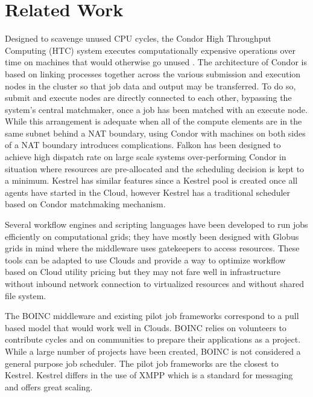 \chapter{Related Work}
\label{chap:Related-Work}
Designed to scavenge unused CPU cycles, the Condor High Throughput
Computing (HTC) system executes computationally expensive operations
over time on machines that would otherwise go unused \cite{Tannenbaum2001,DouglasThain2006}.
The architecture of Condor is based on linking processes together
across the various submission and execution nodes in the cluster so
that job data and output may be transferred. To do so, submit and
execute nodes are directly connected to each other, bypassing the
system's central matchmaker, once a job has been matched with an execute
node. While this arrangement is adequate when all of the compute elements
are in the same subnet behind a NAT boundary, using Condor with machines
on both sides of a NAT boundary introduces complications. Falkon \cite{Raicu2007}has
been designed to achieve high dispatch rate on large scale systems
over-performing Condor in situation where resources are pre-allocated
and the scheduling decision is kept to a minimum. Kestrel has similar
features since a Kestrel pool is created once all agents have started
in the Cloud, however Kestrel has a traditional scheduler based on
Condor matchmaking mechanism.

Several workflow engines \cite{Deelman2004,Oinn2004} and scripting
languages \cite{Wilde2009} have been developed to run jobs efficiently
on computational grids; they have mostly been designed with Globus
\cite{Foster1997} grids in mind where the middleware uses gatekeepers
to access resources. These tools can be adapted to use Clouds and
provide a way to optimize workflow based on Cloud utility pricing
\cite{Deelman2009}but they may not fare well in infrastructure without
inbound network connection to virtualized resources and without shared
file system.

The BOINC \cite{Anderson2004} middleware and existing pilot job frameworks
\cite{Maeno2008,Sfiligoi2008,Tsaregorodtsev2004} correspond to a
pull based model that would work well in Clouds. BOINC relies on volunteers
to contribute cycles and on communities to prepare their applications
as a project. While a large number of projects have been created,
BOINC is not considered a general purpose job scheduler. The pilot
job frameworks are the closest to Kestrel. Kestrel differs in the
use of XMPP which is a standard for messaging and offers great scaling.

